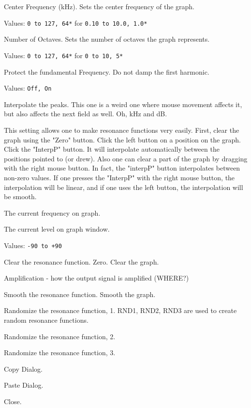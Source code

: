    Center Frequency (kHz).
   Sets the center frequency of the graph.

   Values: \texttt{0 to 127, 64*} for \texttt{0.10 to 10.0, 1.0*}

   Number of Octaves.
   Sets the number of octaves the graph represents.

   Values: \texttt{0 to 127, 64*} for \texttt{0 to 10, 5*}

   Protect the fundamental Frequency.
   Do not damp the first harmonic.

   Values: \texttt{Off, On}

   Interpolate the peaks.
   This one is a weird one where mouse movement affects it,
   but also affects the next field as well.  Oh, kHz and dB.

   This setting allows one to make resonance functions very easily. First,
   clear the graph using the "Zero" button. Click the left button on a
   position on the graph. Click the "InterpP" button. It will interpolate
   automatically between the positions pointed to (or drew).  Also one can
   clear a part of the graph by dragging with the right mouse button. In
   fact, the "interpP" button interpolates between non-zero values.  If one
   presses the "InterpP" with the right mouse button, the interpolation will
   be linear, and if one uses the left button, the interpolation will be
   smooth. 

   The current frequency on graph.

   The current level on graph window.

   Values: \texttt{-90 to +90}

   Clear the resonance function.
   Zero. Clear the graph.

   Amplification - how the output signal is amplified (WHERE?)

   Smooth the resonance function.
   Smooth the graph.

   Randomize the resonance function, 1.
   RND1, RND2, RND3 are used to create random resonance functions.

   Randomize the resonance function, 2.

   Randomize the resonance function, 3.

   Copy Dialog.

   Paste Dialog.

   Close.

